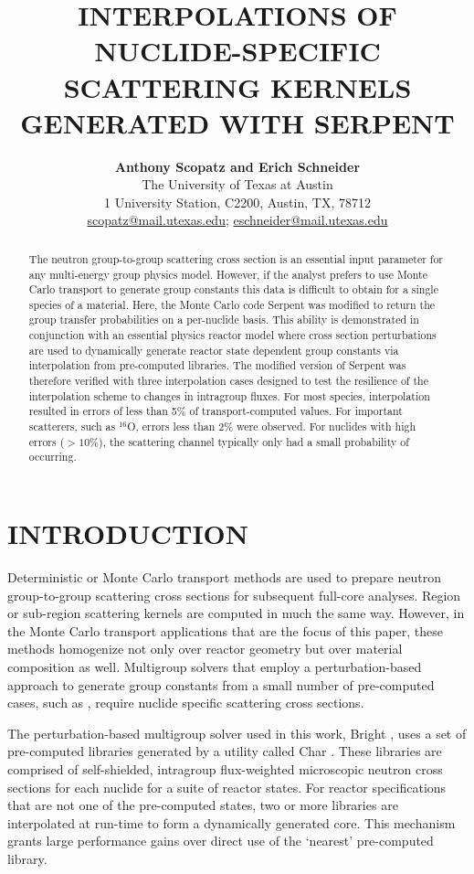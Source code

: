 \documentclass{physor2012}
\title{INTERPOLATIONS OF NUCLIDE-SPECIFIC SCATTERING KERNELS \\
       GENERATED WITH SERPENT}
\author{%
  \textbf{Anthony Scopatz and Erich Schneider} \\
  The University of Texas at Austin \\
  1 University Station, C2200, Austin, TX, 78712 \\
  \url{scopatz@mail.utexas.edu}; \url{eschneider@mail.utexas.edu} \\
}
\newcommand{\superscript}[1]{\ensuremath{^{\textrm{#1}}}}
\newcommand{\nuc}[2]{\superscript{#2}{#1}}
\begin{document}
\maketitle
\begin{abstract}
    The neutron group-to-group scattering cross section is an essential
    input parameter for any multi-energy group physics model.  However,
    if the analyst prefers to use Monte Carlo transport to generate group 
    constants this data is difficult to obtain for a single species of a material.  
    Here, the Monte Carlo code Serpent was modified to return the group transfer 
    probabilities on a per-nuclide basis.  This ability is demonstrated in conjunction with
    an essential physics reactor model where cross section perturbations
    are used to dynamically generate reactor state dependent group constants via 
    interpolation from pre-computed libraries.  The modified version of Serpent was 
    therefore verified with three interpolation cases designed to test the resilience 
    of the interpolation scheme to changes in intragroup fluxes.  For most species, 
    interpolation resulted in errors of less than 5\% of transport-computed values.  
    For important scatterers, such as \nuc{O}{16}, errors less than 2\% were observed.
    For nuclides with high errors ($>10\%$), the scattering channel typically
    only had a small probability of occurring.
\end{abstract}


\section{INTRODUCTION}
Deterministic or Monte Carlo transport methods are used to prepare neutron 
group-to-group scattering cross sections for subsequent full-core analyses.  
Region or sub-region scattering kernels are computed in much the same way.  
However, in the Monte Carlo transport applications that are the focus of 
this paper, these methods homogenize not only over reactor geometry but 
over material composition as well.  Multigroup solvers that employ a 
perturbation-based approach to generate group constants from a small 
number of pre-computed cases, such as \cite{ScopatzAnthony2011}, require 
nuclide specific scattering cross sections.

The perturbation-based multigroup solver used in this work, Bright \cite{Scopatz2011c}, uses a
set of pre-computed libraries generated by a utility called Char \cite{ScopatzAnthony2011}.
These libraries are comprised of self-shielded, intragroup flux-weighted microscopic 
neutron cross sections for each nuclide for a suite of reactor states.  For reactor
specifications that are not one of the pre-computed states, two or more libraries
are interpolated at run-time to form a dynamically generated core.  This mechanism
grants large performance gains over direct use of the `nearest' pre-computed library.
\end{document}
